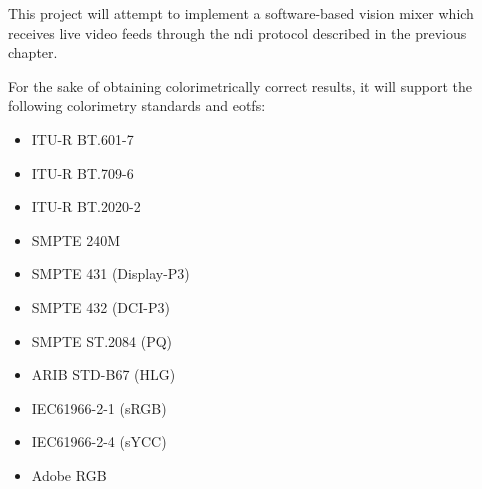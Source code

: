 \documentclass[../main.tex]{subfiles}
\begin{document}
This project will attempt to implement a software-based vision mixer which receives live video feeds through the \gls{ndi} protocol described in the previous chapter.\newline



For the sake of obtaining colorimetrically correct results, it will support the following colorimetry standards and \glspl{eotf}:
\begin{itemize}
    \item ITU-R BT.601-7\cite{bt601}
    \item ITU-R BT.709-6\cite{bt709}
    \item ITU-R BT.2020-2\cite{bt2020}
    \item SMPTE 240M\cite{smpte240M}
    \item SMPTE 431 (Display-P3)\cite{smpte431}
    \item SMPTE 432 (DCI-P3)\cite{smpte432}
    \item SMPTE ST.2084 (PQ)\cite{smpte2084}
    \item ARIB STD-B67 (HLG)\cite{aribStdB67}
    \item IEC61966-2-1 (sRGB)
    \item IEC61966-2-4 (sYCC)
    \item Adobe RGB
    
\end{itemize}

\printbibliography
\end{document}
